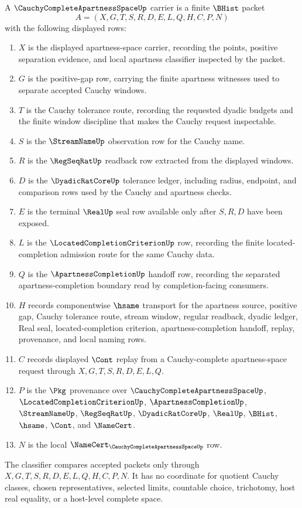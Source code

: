 \begin{definition}
\label{def:cauchy-complete-apartness-space-carrier}
A $\CauchyCompleteApartnessSpaceUp$ carrier is a finite $\BHist$ packet
$$
A=(X,G,T,S,R,D,E,L,Q,H,C,P,N)
$$
with the following displayed rows:
\begin{enumerate}
\item $X$ is the displayed apartness-space carrier, recording the points, positive separation evidence, and local apartness classifier inspected by the packet.
\item $G$ is the positive-gap row, carrying the finite apartness witnesses used to separate accepted Cauchy windows.
\item $T$ is the Cauchy tolerance route, recording the requested dyadic budgets and the finite window discipline that makes the Cauchy request inspectable.
\item $S$ is the $\StreamNameUp$ observation row for the Cauchy name.
\item $R$ is the $\RegSeqRatUp$ readback row extracted from the displayed windows.
\item $D$ is the $\DyadicRatCoreUp$ tolerance ledger, including radius, endpoint, and comparison rows used by the Cauchy and apartness checks.
\item $E$ is the terminal $\RealUp$ seal row available only after $S,R,D$ have been exposed.
\item $L$ is the $\LocatedCompletionCriterionUp$ row, recording the finite located-completion admission route for the same Cauchy data.
\item $Q$ is the $\ApartnessCompletionUp$ handoff row, recording the separated apartness-completion boundary read by completion-facing consumers.
\item $H$ records componentwise $\hsame$ transport for the apartness source, positive gap, Cauchy tolerance route, stream window, regular readback, dyadic ledger, Real seal, located-completion criterion, apartness-completion handoff, replay, provenance, and local naming rows.
\item $C$ records displayed $\Cont$ replay from a Cauchy-complete apartness-space request through $X,G,T,S,R,D,E,L,Q$.
\item $P$ is the $\Pkg$ provenance over $\CauchyCompleteApartnessSpaceUp$, $\LocatedCompletionCriterionUp$, $\ApartnessCompletionUp$, $\StreamNameUp$, $\RegSeqRatUp$, $\DyadicRatCoreUp$, $\RealUp$, $\BHist$, $\hsame$, $\Cont$, and $\NameCert$.
\item $N$ is the local $\NameCert_{\CauchyCompleteApartnessSpaceUp}$ row.
\end{enumerate}
The classifier compares accepted packets only through $X,G,T,S,R,D,E,L,Q,H,C,P,N$. It has no coordinate for quotient Cauchy classes, chosen representatives, selected limits, countable choice, trichotomy, host real equality, or a host-level complete space.
\end{definition}

